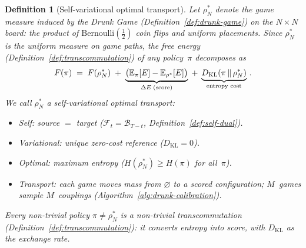 \documentclass[11pt,a4paper]{article}
\newtheorem{definition}[theorem]{Definition}
\newcommand{\cF}{\mathcal{F}}
\newcommand{\cB}{\mathcal{B}}
\newcommand{\DKL}{D_{\mathrm{KL}}}
\begin{document}
\begin{definition}[Self-variational optimal transport]%
\label{def:svot}
Let $\rho^*_N$ denote the game measure induced by
the Drunk Game (Definition~\ref{def:drunk-game})
on the $N \times N$ board:
the product of $\mathrm{Bernoulli}(\tfrac{1}{2})$ coin flips
and uniform placements.
Since $\rho^*_N$ is the uniform measure on game paths,
the free energy
(Definition~\ref{def:transcommutation})
of any policy~$\pi$ decomposes as
\begin{equation}\label{eq:svot}
  F(\pi)
  \;=\;
  F(\rho^*_N)
  \;+\;
  \underbrace{\bigl(\mathbb{E}_\pi[E]
    - \mathbb{E}_{\rho^*}[E]\bigr)}_{%
    \Delta E\;\text{(score)}}
  \;+\;
  \underbrace{\DKL(\pi \,\|\, \rho^*_N)}_{%
    \text{entropy cost}}\,.
\end{equation}
We call $\rho^*_N$ a \emph{self-variational optimal transport}:
\begin{itemize}[nosep]
\item \emph{Self:}\;
  source $=$ target
  ($\cF_t = \cB_{T-t}$, Definition~\ref{def:self-dual}).
\item \emph{Variational:}\;
  unique zero-cost reference ($\DKL = 0$).
\item \emph{Optimal:}\;
  maximum entropy ($H(\rho^*_N) \geq H(\pi)$ for all~$\pi$).
\item \emph{Transport:}\;
  each game moves mass from $\varnothing$ to a scored
  configuration; $M$~games sample $M$~couplings
  (Algorithm~\ref{alg:drunk-calibration}).
\end{itemize}
Every non-trivial policy $\pi \neq \rho^*_N$ is a
non-trivial transcommutation
(Definition~\ref{def:transcommutation}):
it converts entropy into score,
with $\DKL$ as the exchange rate.
\end{definition}
\end{document}
